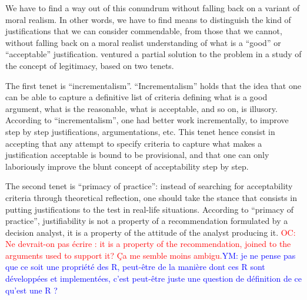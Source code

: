 \documentclass[preprint, french, english, 11pt]{elsarticle}%
\newcommand{\commentYM}[1]{\textcolor{blue}{YM: #1}}
\newcommand{\commentOC}[1]{\textcolor{red}{OC: #1}}
\begin{document}
 
 
 
We have to find a way out of this conundrum without falling back on a variant of moral realism. In other words, we have to find means to distinguish the kind of justifications that we can consider commendable, from those that we cannot, without falling back on a moral realist understanding of what is a ``good'' or ``acceptable'' justification. \cite{meinard_what_2017} ventured a partial solution to the problem in a study of the concept of legitimacy, based on two tenets.

The first tenet is ``incrementalism''. ``Incrementalism'' holds that the idea that one can be able to capture a definitive list of criteria defining what is a good argument, what is the reasonable, what is acceptable, and so on, is illusory. According to ``incrementalism'', one had better work incrementally, to improve step by step justifications, argumentations, etc. This tenet hence consist in accepting that any attempt to specify criteria to capture what makes a justification acceptable is bound to be provisional, and that one can only laboriously improve the blunt concept of acceptability step by step.

The second tenet is ``primacy of practice'': instead of searching for acceptability criteria through theoretical reflection, one should take the stance that consists in putting justifications to the test in real-life situations. According to ``primacy of practice'', justifiability is not a property of a recommendation formulated by a decision analyst, it is a property of the attitude of the analyst producing it.
\commentOC{Ne devrait-on pas écrire : it is a property of the recommendation, joined to the arguments used to support it? Ça me semble moins ambigu.}\commentYM{je ne pense pas que ce soit une propriété des R, peut-être de la manière dont ces R sont développées et implementées, c'est peut-être juste une question de définition de ce qu'est une R ?}
\end{document}
